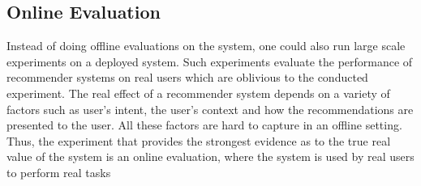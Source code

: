 


\subsection{Online Evaluation}

Instead of doing offline evaluations on the system, one could also run large
scale experiments on a deployed system. Such experiments evaluate the
performance of recommender systems on real users which are oblivious to the
conducted experiment. The real effect of a recommender system depends on a
variety of factors such as user’s intent, the user’s context and how the
recommendations are presented to the user. All these factors are hard to
capture in an offline setting. Thus, the experiment that provides the strongest
evidence as to the true real value of the system is an online evaluation, where
the system is used by real users to perform real tasks

